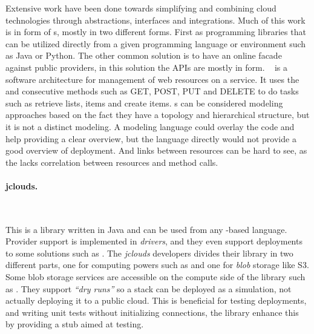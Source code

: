 Extensive work have been done towards simplifying and combining cloud technologies through
abstractions, interfaces and integrations.
Much of this work is in form of s, mostly in two different forms.
First as programming libraries that can be utilized directly from a given 
programming language or environment such as Java or Python.
The other common solution is to have an online facade against public providers,
in this solution the APIs are mostly in  form.
~\cite{rest:fielding00} is a software architecture for management of web resources
on a service. It uses the  and consecutive methods such as GET, POST, PUT and DELETE
to do tasks such as retrieve lists, items and create items.
s can be considered modeling approaches based on the fact they have a topology 
and hierarchical structure, 
but it is not a distinct modeling. 
A modeling language could overlay the code and help providing a clear overview, 
but the language directly would not provide a good overview of deployment. 
And links between resources can be hard to see, 
as the  lacks correlation between resources and method calls. 




\paragraph{jclouds.}~\cite{jclouds}

This is a library written in Java and can be used from any -based language.
Provider support is implemented in \emph{drivers}, and they even support deployments
to some  solutions such as .
The \emph{jclouds} developers divides their library in two different parts, one for computing powers 
such as  and one for \emph{blob} storage like S3. 
Some blob storage services are accessible on the compute side of the library such
as .
They support \emph{``dry runs''} so a stack can be deployed as a simulation, not 
actually deploying it to a public cloud.
This is beneficial for testing deployments, and writing unit tests without initializing
connections, the library enhance this by providing a stub aimed at testing.

